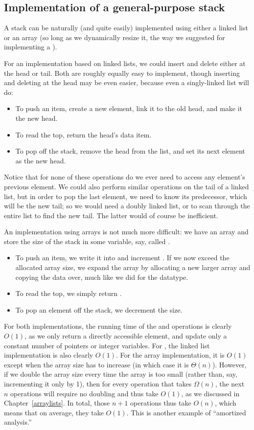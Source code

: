 \subsection{Implementation of a general-purpose stack}

A stack can be naturally (and quite easily) implemented using either a
linked list or an array (so long as we dynamically resize it, the way we
suggested for implementing a ).

For an implementation based on linked lists, we could insert and
delete either at the head or tail. Both are roughly equally easy to
implement, though inserting and deleting at the head may be even
easier, because even a singly-linked list will do:
\begin{itemize}
\item To push an item, create a new element, link it to the old head,
  and make it the new head.
\item To read the top, return the head's data item.
\item To pop off the stack, remove the head from the list, and set its
  next element as the new head.
\end{itemize}
Notice that for none of these operations do we ever need to access any
element's previous element. 
We could also perform similar operations on the tail of a linked
list, but in order to pop the last element, we need to know its
predecessor, which will be the new tail; so we would need a doubly
linked list, or to scan through the entire list to find the new tail.
The latter would of course be inefficient.

An implementation using arrays is not much more difficult:
we have an array  and store the size of the stack in some
variable, say, called .
\begin{itemize}
\item To push an item, we write it into  and increment
  . If we now exceed the allocated array size, we expand the
  array by allocating a new larger array and copying the data over,
  much like we did for the  datatype.
\item To read the top, we simply return .
\item To pop an element off the stack, we decrement the size.
\end{itemize}

For both implementations, the running time of the  and
 operations is clearly $O(1)$, as we only return a directly
accessible element, and update only a constant number of pointers or
integer variables.
For , the linked list implementation is also clearly $O(1)$.
For the array implementation, it is $O(1)$ except when the
array size has to increase (in which case it is $\Theta(n)$).
However, if we double the array size every time the array is too small
(rather than, say, incrementing it only by 1), then for every
operation that takes $\Omega(n)$, the next $n$ operations will
require no doubling and thus take $O(1)$,
as we discussed in Chapter~\ref{arraylists}.
In total, those $n+1$ operations thus take $O(n)$,
which means that on average, they take $O(1)$. 
This is another example of ``amortized analysis.''

